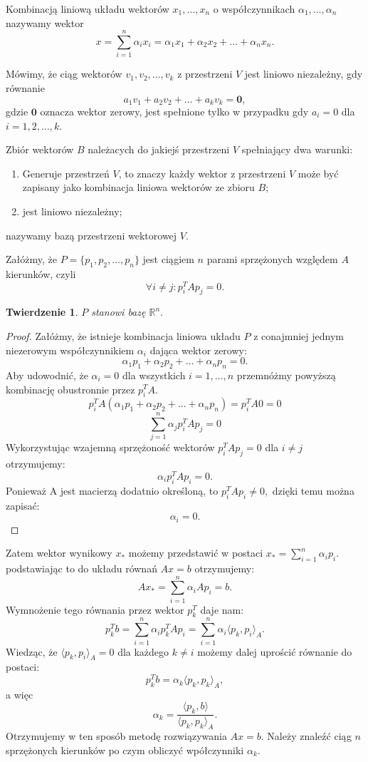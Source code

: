 \documentclass[a4paper,12pt]{book} %
\begin{document}
\begin{df}
Kombinacją liniową układu wektorów $x_1, \ldots,x_n$ o współczynnikach $\alpha_1,\ldots,\alpha_n$ nazywamy wektor
$$ x = \sum_{i=1}^n\alpha_ix_i = \alpha_1x_1 + \alpha_2x_2 + \ldots + \alpha_nx_n.$$
\end{df}

\begin{df}
Mówimy, że ciąg wektorów $v_1, v_2, \ldots, v_k$ z przestrzeni $V$ jest liniowo niezależny, gdy równanie $$a_1v_1 + a_2v_2 + \ldots + a_kv_k = \mathbf{0},$$ gdzie $\mathbf{0}$ oznacza wektor zerowy, jest spełnione tylko w przypadku gdy $a_i = 0$ dla $i = 1, 2, \ldots, k.$
\end{df}

\begin{df} 
Zbiór wektorów $B$ należacych do jakiejś przestrzeni $V$ spełniający dwa warunki:
\begin{enumerate}
\item Generuje przestrzeń $V$, to znaczy każdy wektor z przestrzeni $V$ może być zapisany jako kombinacja liniowa wektorów ze zbioru $B;$
\item jest liniowo niezależny;
\end{enumerate}
nazywamy bazą przestrzeni wektorowej $V$.
\end{df}


Załóżmy, że $P = \{p_1, p_2, \ldots, p_n\}$ jest ciągiem $n$ parami sprzężonych względem $A$ kierunków, czyli 
$$\forall i \neq j: p_i^TAp_j = 0 .$$

\newtheorem{thm}{Twierdzenie} 
\theoremstyle{definition}
\begin{thm}
$P$ stanowi bazę $\mathbb{R}^n.$
\end{thm}
\begin{proof}
Załóżmy, że istnieje kombinacja liniowa układu $P$ z conajmniej jednym niezerowym współczynnikiem $\alpha_i$ dająca wektor zerowy:
$$\alpha_1p_1 + \alpha_2p_2 + \ldots + \alpha_np_n = 0.$$
Aby udowodnić, że $\alpha_i = 0$ dla wszystkich $i=1,\ldots,n$ przemnóżmy powyższą kombinację obustronnie przez $p_i^TA.$
$$p_i^TA(\alpha_1p_1 + \alpha_2p_2 + \ldots + \alpha_np_n) = p_i^TA0 = 0$$
$$\sum_{j=1}^n\alpha_jp_i^TAp_j = 0$$
Wykorzystując wzajemną sprzężoność wektorów $p_i^TAp_j = 0$ dla $i \neq j$ otrzymujemy:
$$\alpha_ip_i^TAp_i = 0.$$ 
Ponieważ A jest macierzą dodatnio określoną, to $p_i^TAp_i \neq 0,$ dzięki temu można zapisać: $$\alpha_i = 0.$$ 
\end{proof}


Zatem wektor wynikowy $x_*$ możemy przedstawić w postaci $x_* = \sum_{i=1}^n\alpha_ip_i.$ podstawiając to do układu równań $Ax = b$ otrzymujemy:
$$ Ax_* = \sum^n_{i=1}\alpha_iAp_i = b. $$ Wymnożenie tego równania przez wektor $p_k^T$ daje nam:
$$p_k^Tb = \sum_{i=1}^n\alpha_ip_k^TAp_i = \sum_{i=1}^n\alpha_i\langle p_k, p_i\rangle_A.$$
Wiedząc, że $\langle p_k, p_i \rangle_A = 0$ dla każdego $k \neq i$ możemy dalej uprościć równanie do postaci:
$$p_k^Tb = \alpha_k\langle p_k, p_k\rangle_A,$$ 
a więc
$$ \alpha_k = \frac{\langle p_k, b \rangle }{\langle p_k, p_k \rangle_A}. $$
Otrzymujemy w ten sposób metodę rozwiązywania $Ax = b.$ Należy znaleźć ciąg $n$ sprzężonych kierunków po czym obliczyć wpółczynniki $\alpha_k.$
\end{document}
